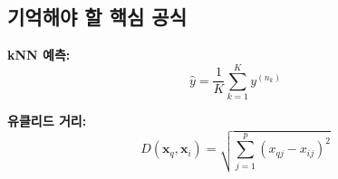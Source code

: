 \documentclass[12pt,a4paper]{article}
\begin{document}
\subsection{기억해야 할 핵심 공식}

\textbf{kNN 예측:}
\begin{equation}
\hat{y} = \frac{1}{K}\sum_{k=1}^{K}y^{(n_k)}
\end{equation}

\textbf{유클리드 거리:}
\begin{equation}
D(\mathbf{x}_q, \mathbf{x}_i) = \sqrt{\sum_{j=1}^{p}(x_{qj} - x_{ij})^2}
\end{equation}
\end{document}
